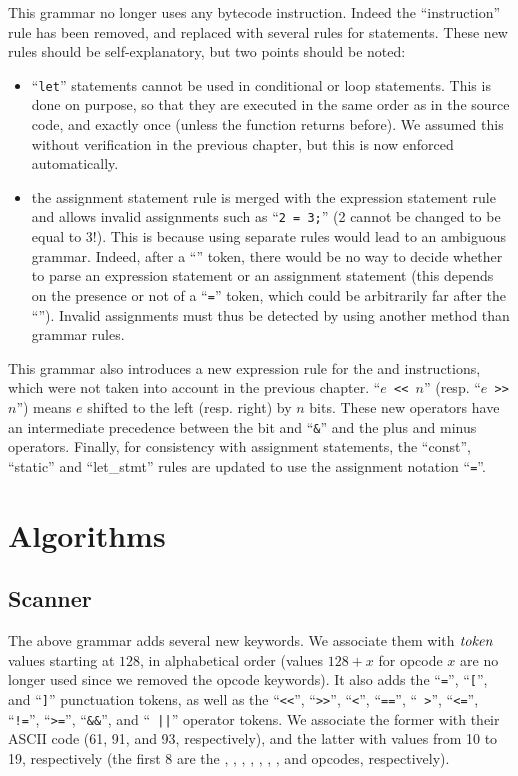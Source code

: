 This grammar no longer uses any bytecode instruction. Indeed the
``instruction'' rule has been removed, and replaced with several rules for
statements. These new rules should be self-explanatory, but two points should
be noted:
\begin{itemize}
  \item ``{\tt let}'' statements cannot be used in conditional or loop
  statements. This is done on purpose, so that they are executed in the same
  order as in the source code, and exactly once (unless the function returns
  before). We assumed this without verification in the previous chapter, but
  this is now enforced automatically.

  \item the assignment statement rule is merged with the expression statement
  rule and allows invalid assignments such as ``{\tt 2 = 3;}'' (2 cannot be
  changed to be equal to 3!). This is because using separate rules would lead
  to an ambiguous grammar. Indeed, after a ``{\tt *}'' token, there would be no
  way to decide whether to parse an expression statement or an assignment
  statement (this depends on the presence or not of a ``{\tt =}'' token, which
  could be arbitrarily far after the ``{\tt *}''). Invalid assignments must
  thus be detected by using another method than grammar rules.
\end{itemize}

This grammar also introduces a new expression rule for the  and
 instructions, which were not taken into account in the previous
chapter. ``{\tt $e$ \verb!<<! $n$}'' (resp. ``{\tt $e$ \verb!>>! $n$}'') means
$e$ shifted to the left (resp. right) by $n$ bits. These new operators have an
intermediate precedence between the bit and ``{\tt \&}'' and the plus and minus
operators. Finally, for consistency with assignment statements, the ``const'',
``static'' and ``let\_stmt'' rules are updated to use the assignment notation
``{\tt =}''.

\section{Algorithms}

\subsection{Scanner}\label{subsection:toyc3-scanner}

The above grammar adds several new keywords. We associate them with
$\it{token}$ values starting at $128$, in alphabetical order (values $128+x$
for opcode $x$ are no longer used since we removed the opcode keywords). It
also adds the ``{\tt =}'', ``{\tt [}'', and ``{\tt ]}'' punctuation tokens, as
well as the  ``\verb!<<!'', ``\verb!>>!'', ``{\tt <}'', ``{\tt ==}'', ``{\tt
>}'', ``{\tt <=}'', ``{\tt !=}'', ``{\tt >=}'', ``{\tt \&\&}'', and ``{\tt
||}'' operator tokens. We associate the former with their ASCII code (61, 91,
and 93, respectively), and the latter with values from 10 to 19, respectively
(the first 8 are the , , , ,
, , , and  opcodes, respectively).

